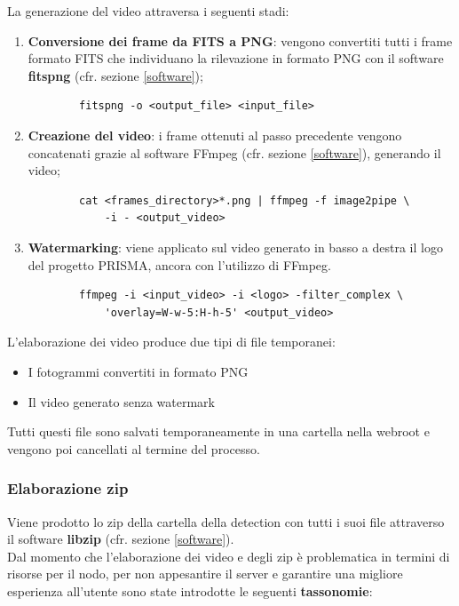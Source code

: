 La generazione del video attraversa i seguenti stadi:
\begin{enumerate}
    \item \textbf{Conversione dei frame da FITS a PNG}: vengono convertiti tutti i frame formato FITS che individuano la rilevazione in formato PNG con il software \textbf{fitspng} (cfr. sezione \ref{software});
    \begin{verbatim}
        fitspng -o <output_file> <input_file>
    \end{verbatim}
    \item \textbf{Creazione del video}: i frame ottenuti al passo precedente vengono concatenati grazie al software FFmpeg (cfr. sezione \ref{software}), generando il video;
    \begin{verbatim}
        cat <frames_directory>*.png | ffmpeg -f image2pipe \
            -i - <output_video>
    \end{verbatim}
    \item \textbf{Watermarking}: viene applicato sul video generato in basso a destra il logo del progetto PRISMA, ancora con l'utilizzo di FFmpeg.
    \begin{verbatim}
        ffmpeg -i <input_video> -i <logo> -filter_complex \
            'overlay=W-w-5:H-h-5' <output_video>
    \end{verbatim}
\end{enumerate}

L'elaborazione dei video produce due tipi di file temporanei:
\begin{itemize}[noitemsep,nolistsep]
    \item I fotogrammi convertiti in formato PNG
    \item Il video generato senza watermark
\end{itemize}
Tutti questi file sono salvati temporaneamente in una cartella nella webroot e vengono poi cancellati al termine del processo.

\subsubsection{Elaborazione zip}

Viene prodotto lo zip della cartella della detection con tutti i suoi file attraverso il software \textbf{libzip} (cfr. sezione \ref{software}).\\

Dal momento che l'elaborazione dei video e degli zip è problematica in termini di risorse per il nodo, per non appesantire il server e garantire una migliore esperienza all'utente sono state introdotte le seguenti \textbf{tassonomie}:


